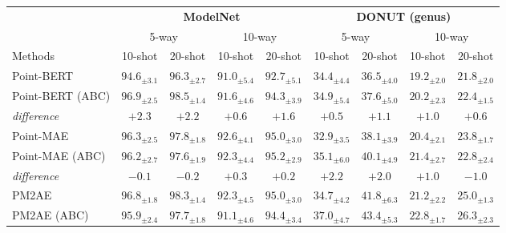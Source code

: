 \begin{table}
\begin{center}
\begin{tabular}{l|cccc|cccc}
    
\toprule
& \multicolumn{4}{c|}{\textbf{ModelNet}} & \multicolumn{4}{c}{\textbf{DONUT (genus)}} \\
& \multicolumn{2}{c}{5-way} & \multicolumn{2}{c|}{10-way} & \multicolumn{2}{c}{5-way} & \multicolumn{2}{c}{10-way} \\
\cmidrule(lr){2-3} \cmidrule(lr){4-5} \cmidrule(lr){6-7} \cmidrule(lr){8-9}
Methods & 10-shot & 20-shot & 10-shot & 20-shot & 10-shot & 20-shot & 10-shot & 20-shot \\
\midrule

Point-BERT~\cite{pbert} & $94.6_{\pm 3.1}$ & $96.3_{\pm 2.7}$ & $91.0_{\pm 5.4}$ & $92.7_{\pm 5.1}$ & $34.4_{\pm 4.4}$ & $36.5_{\pm 4.0}$ & $19.2_{\pm 2.0}$ & $21.8_{\pm 2.0}$\\
Point-BERT (ABC) & $96.9_{\pm 2.5}$ & $98.5_{\pm 1.4}$ & $91.6_{\pm 4.6}$ & $94.3_{\pm 3.9}$ & $34.9_{\pm 5.4}$ & $37.6_{\pm 5.0}$ & $20.2_{\pm 2.3}$ & $22.4_{\pm 1.5}$\\
\textit{difference} & \cellcolor{green!25}$+2.3$ & \cellcolor{green!25}$+2.2$ & \cellcolor{green!25}$+0.6$ & \cellcolor{green!25}$+1.6$ & \cellcolor{green!25}$+0.5$ & \cellcolor{green!25}$+1.1$ & \cellcolor{green!25}$+1.0$ & \cellcolor{green!25}$+0.6$ \\
\midrule
Point-MAE~\cite{pmae} & $96.3_{\pm 2.5}$ & $97.8_{\pm 1.8}$ & $92.6_{\pm 4.1}$ & $95.0_{\pm 3.0}$ & $32.9_{\pm 3.5}$ & $38.1_{\pm 3.9}$ & $20.4_{\pm 2.1}$ & $23.8_{\pm 1.7}$ \\
Point-MAE (ABC) & $96.2_{\pm 2.7}$ & $97.6_{\pm 1.9}$ & $92.3_{\pm 4.4}$ & $95.2_{\pm 2.9}$ & $35.1_{\pm 6.0}$ & $40.1_{\pm 4.9}$ & $21.4_{\pm 2.7}$ & $22.8_{\pm 2.4}$\\
\textit{difference} & \cellcolor{orange!25}$-0.1$ & \cellcolor{orange!25}$-0.2$ & \cellcolor{green!25}$+0.3$ & \cellcolor{green!25}$+0.2$ & \cellcolor{green!25}$+2.2$ & \cellcolor{green!25}$+2.0$ & \cellcolor{green!25}$+1.0$ & \cellcolor{orange!25}$-1.0$ \\
\midrule
PM2AE~\cite{pm2ae} & $96.8_{\pm 1.8}$ & $98.3_{\pm 1.4}$ & $92.3_{\pm 4.5}$ & $95.0_{\pm 3.0}$ & $34.7_{\pm 4.2}$ & $41.8_{\pm 6.3}$ & $21.2_{\pm 2.2}$ & $25.0_{\pm 1.3}$\\
PM2AE (ABC) & $95.9_{\pm 2.4}$ &$97.7_{\pm 1.8}$ & $91.1_{\pm 4.6}$ & $94.4_{\pm 3.4}$ & $37.0_{\pm 4.7}$ & $43.4_{\pm 5.3}$ & $22.8_{\pm 1.7}$ & $26.3_{\pm 2.3}$\\

\end{tabular}
\end{center}
\end{table}
